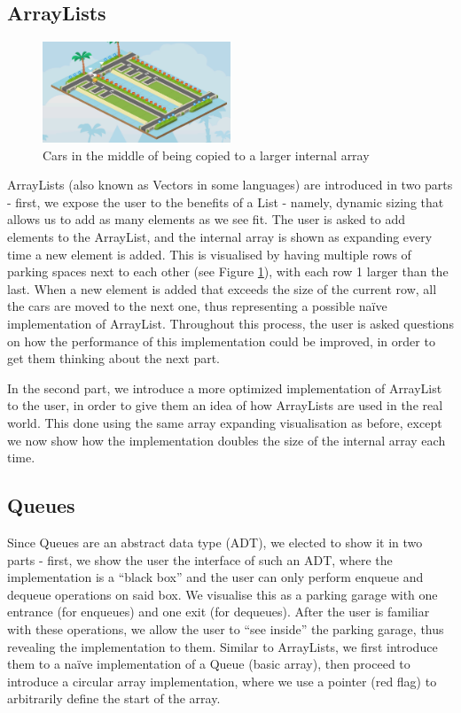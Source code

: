 \documentclass[11pt]{article}
\begin{document}
\subsection{ArrayLists}
\begin{figure}
  \centering
  \includegraphics[width=0.5\textwidth]{images/listcopy.png}
\caption{Cars in the middle of being copied to a larger internal array}
\label{fig:listcopy}
\end{figure}
ArrayLists (also known as Vectors in some languages) are introduced in two parts - first, we expose the user to the benefits of a List - namely, dynamic sizing that allows us to add as many elements as we see fit. The user is asked to add elements to the ArrayList, and the internal array is shown as expanding every time a new element is added. This is visualised by having multiple rows of parking spaces next to each other (see Figure \ref{fig:listcopy}), with each row 1 larger than the last. When a new element is added that exceeds the size of the current row, all the cars are moved to the next one, thus representing a possible naïve implementation of ArrayList. Throughout this process, the user is asked questions on how the performance of this implementation could be improved, in order to get them thinking about the next part.\par
In the second part, we introduce a more optimized implementation of ArrayList to the user, in order to give them an idea of how ArrayLists are used in the real world. This done using the same array expanding visualisation as before, except we now show how the implementation doubles the size of the internal array each time.
\subsection{Queues}
Since Queues are an abstract data type (ADT), we elected to show it in two parts - first, we show the user the interface of such an ADT, where the implementation is a ``black box'' and the user can only perform enqueue and dequeue operations on said box. We visualise this as a parking garage with one entrance (for enqueues) and one exit (for dequeues). After the user is familiar with these operations, we allow the user to ``see inside'' the parking garage, thus revealing the implementation to them. Similar to ArrayLists, we first introduce them to a naïve implementation of a Queue (basic array), then proceed to introduce a circular array implementation, where we use a pointer (red flag) to arbitrarily define the start of the array.
\end{document}

